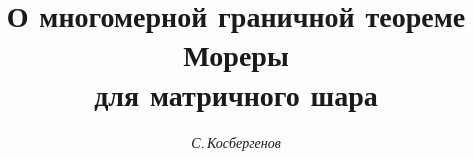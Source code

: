 

 


% 


\newcommand{\la}{\langle} 


\newcommand{\ra}{\rangle} 


\newcommand{\sP}{\operatorname{Sp}} 


\newcommand{\tts}[1]{} 


 




 


\setcounter{page}{28} 












 


\author{\it С.\,Косбергенов} 




\title{О многомерной граничной теореме Мореры \\ 


для матричного шара} 


 


\date{} 




\pagestyle{plain} %


 




\maketitle 


